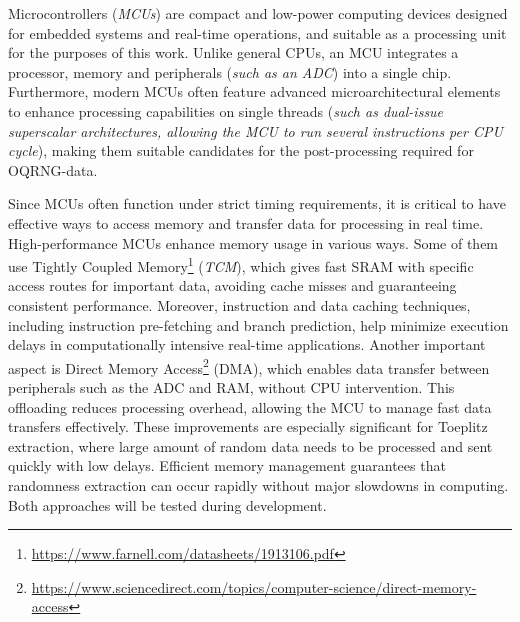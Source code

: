 \documentclass{sigchi}
\begin{document}
Microcontrollers (\emph{MCUs}) are compact and low-power computing devices designed for embedded systems and real-time operations, and suitable as a processing unit for the purposes of this work. Unlike general CPUs, an MCU integrates a processor, memory and peripherals (\emph{such as an ADC}) into a single chip. Furthermore, modern MCUs often feature advanced microarchitectural elements to enhance processing capabilities on single threads (\emph{such as dual-issue superscalar architectures, allowing the MCU to run several instructions per CPU cycle}), making them suitable candidates for the post-processing required for OQRNG-data.

Since MCUs often function under strict timing requirements, it is critical to have effective ways to access memory and transfer data for processing in real time. High-performance MCUs enhance memory usage in various ways. Some of them use Tightly Coupled Memory\footnote{\url{https://www.farnell.com/datasheets/1913106.pdf}} (\emph{TCM}), which gives fast SRAM with specific access routes for important data, avoiding cache misses and guaranteeing consistent performance. Moreover, instruction and data caching techniques, including instruction pre-fetching and branch prediction, help minimize execution delays in computationally intensive real-time applications. Another important aspect is Direct Memory Access\footnote{\url{https://www.sciencedirect.com/topics/computer-science/direct-memory-access}} (DMA), which enables data transfer between peripherals such as the ADC and RAM, without CPU intervention. This offloading reduces processing overhead, allowing the MCU to manage fast data transfers effectively. These improvements are especially significant for Toeplitz extraction, where large amount of random data needs to be processed and sent quickly with low delays. Efficient memory management guarantees that randomness extraction can occur rapidly without major slowdowns in computing. Both approaches will be tested during development.
\end{document}
